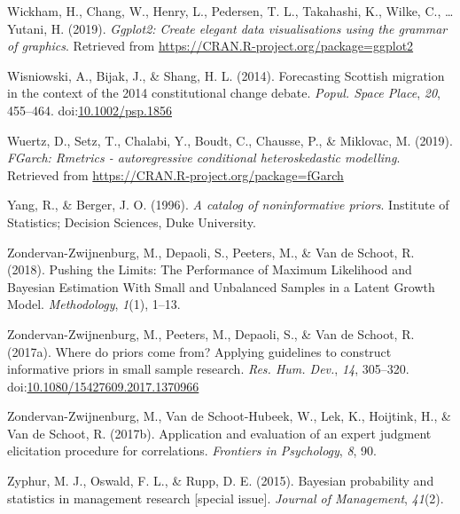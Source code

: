 \documentclass[openright,titlepage,12pt,a4paper]{book}
\begin{document}
\leavevmode\hypertarget{ref-R-ggplot2}{}%
Wickham, H., Chang, W., Henry, L., Pedersen, T. L., Takahashi, K., Wilke, C., \ldots{} Yutani, H. (2019). \emph{Ggplot2: Create elegant data visualisations using the grammar of graphics}. Retrieved from \url{https://CRAN.R-project.org/package=ggplot2}

\leavevmode\hypertarget{ref-wisniowski_forecasting_2014}{}%
Wisniowski, A., Bijak, J., \& Shang, H. L. (2014). Forecasting Scottish migration in the context of the 2014 constitutional change debate. \emph{Popul. Space Place}, \emph{20}, 455--464. doi:\href{https://doi.org/10.1002/psp.1856}{10.1002/psp.1856}

\leavevmode\hypertarget{ref-R-fGarch}{}%
Wuertz, D., Setz, T., Chalabi, Y., Boudt, C., Chausse, P., \& Miklovac, M. (2019). \emph{FGarch: Rmetrics - autoregressive conditional heteroskedastic modelling}. Retrieved from \url{https://CRAN.R-project.org/package=fGarch}

\leavevmode\hypertarget{ref-yang_catalog_1996}{}%
Yang, R., \& Berger, J. O. (1996). \emph{A catalog of noninformative priors}. Institute of Statistics; Decision Sciences, Duke University.

\leavevmode\hypertarget{ref-zondervan-zwijnenburg_pushing_2018}{}%
Zondervan-Zwijnenburg, M., Depaoli, S., Peeters, M., \& Van de Schoot, R. (2018). Pushing the Limits: The Performance of Maximum Likelihood and Bayesian Estimation With Small and Unbalanced Samples in a Latent Growth Model. \emph{Methodology}, \emph{1}(1), 1--13.

\leavevmode\hypertarget{ref-zondervan-zwijnenburg_where_2017}{}%
Zondervan-Zwijnenburg, M., Peeters, M., Depaoli, S., \& Van de Schoot, R. (2017a). Where do priors come from? Applying guidelines to construct informative priors in small sample research. \emph{Res. Hum. Dev.}, \emph{14}, 305--320. doi:\href{https://doi.org/10.1080/15427609.2017.1370966}{10.1080/15427609.2017.1370966}

\leavevmode\hypertarget{ref-zondervan-zwijnenburg_application_2017}{}%
Zondervan-Zwijnenburg, M., Van de Schoot-Hubeek, W., Lek, K., Hoijtink, H., \& Van de Schoot, R. (2017b). Application and evaluation of an expert judgment elicitation procedure for correlations. \emph{Frontiers in Psychology}, \emph{8}, 90.

\leavevmode\hypertarget{ref-zyphur_bayesian_2015}{}%
Zyphur, M. J., Oswald, F. L., \& Rupp, D. E. (2015). Bayesian probability and statistics in management research {[}special issue{]}. \emph{Journal of Management}, \emph{41}(2).
\end{document}
